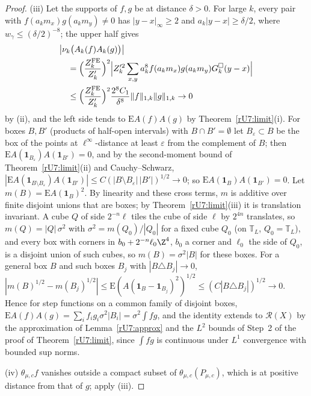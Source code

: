 \begin{proof}
(iii) Let the supports of $f,g$ be at distance $\delta>0$. For large $k$, every
pair with $f(a_km_x)g(a_km_y)\ne0$ has $|y-x|_\infty\ge2$ and $a_k|y-x|\ge
\delta/2$, where $w_\gamma\le(\delta/2)^{-8}$; the upper half gives
\begin{align*}
&\bigl|\nu_k\bigl(A_k(f)A_k(g)\bigr)\bigr|\\
&\quad=\Bigl(\frac{Z^{\mathrm{FE}}_k}{Z_k'}
\Bigr)^2\Bigl|Z_k'^2\sum_{x,y}a_k^8f(a_km_x)g(a_km_y)G^\square_k(y-x)\Bigr|\\
&\quad\le\Bigl(\frac{Z^{\mathrm{FE}}_k}{Z_k'}\Bigr)^2\frac{2^8C_1}{\delta^8}\|f\|_{1,k}
\|g\|_{1,k}\to0
\end{align*}
by (ii), and the left side tends to $\mathrm EA(f)A(g)$ by
Theorem~\ref{rU7:limit}(i). For boxes $B,B'$ (products of half-open intervals)
with $B\cap B'=\emptyset$ let $B_\varepsilon\subset B$ be the box of the points
at $\ell^\infty$-distance at least $\varepsilon$ from the complement of $B$;
then $\mathrm EA(\mathbf 1_{B_\varepsilon})A(\mathbf1_{B'})=0$, and by the
second-moment bound of Theorem~\ref{rU7:limit}(ii) and Cauchy--Schwarz,
$|\mathrm EA(\mathbf1_{B\setminus B_\varepsilon})A(\mathbf1_{B'})|\le C(|B\setminus
B_\varepsilon|\,|B'|)^{1/2}\to0$; so $\mathrm EA(\mathbf1_B)A(\mathbf1_{B'})=0$.
Let $m(B)=\mathrm EA(\mathbf1_B)^2$. By linearity and these cross terms, $m$ is
additive over finite disjoint unions that are boxes; by
Theorem~\ref{rU7:limit}(iii) it is translation invariant. A cube $Q$ of side
$2^{-n}\ell$ tiles the cube of side $\ell$ by $2^{4n}$ translates, so
$m(Q)=|Q|\,\sigma^2$ with $\sigma^2=m(Q_0)/|Q_0|$ for a fixed cube $Q_0$
(on $\mathbb T_L$, $Q_0=\mathbb T_L$), and every box with corners in $b_0+2^{-n}\ell_0\Z^4$, $b_0$ a corner and
$\ell_0$ the side of $Q_0$, is a disjoint union of such cubes, so $m(B)=
\sigma^2|B|$ for these boxes. For a general box $B$ and such boxes $B_j$ with
$|B\triangle B_j|\to0$, $|m(B)^{1/2}-m(B_j)^{1/2}|\le\mathrm E(A(\mathbf1_B-
\mathbf1_{B_j})^2)^{1/2}\le(C|B\triangle B_j|)^{1/2}\to0$. Hence for step
functions on a common family of disjoint boxes, $\mathrm EA(f)A(g)=\sum_if_ig_i
\sigma^2|B_i|=\sigma^2\int fg$, and the identity extends to $\mathcal R(X)$ by the
approximation of Lemma~\ref{rU7:approx} and the $L^2$ bounds of Step~2 of the
proof of Theorem~\ref{rU7:limit}, since $\int fg$ is continuous under $L^1$
convergence with bounded sup norms.

(iv) $\theta_{\mu,c}f$ vanishes outside a compact subset of $\theta_{\mu,c}
(P_{\mu,c})$, which is at positive distance from that of $g$; apply (iii).
\end{proof}

